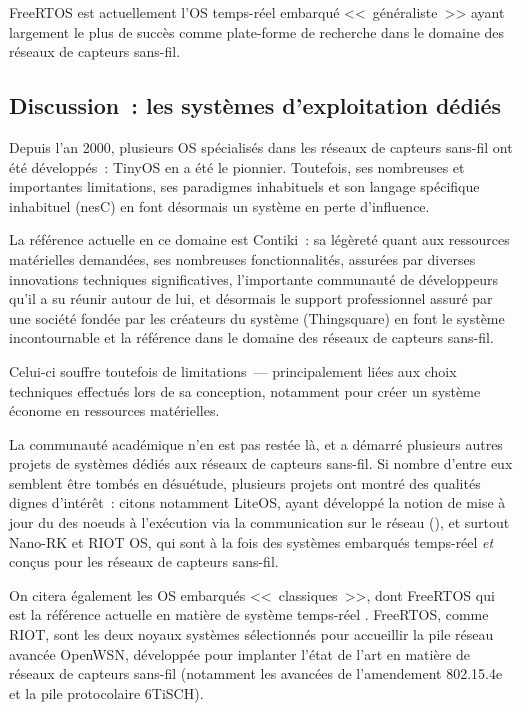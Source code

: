 \bigskip

FreeRTOS est actuellement l'OS temps-réel embarqué <<~généraliste~>> ayant
largement le plus de succès comme plate-forme de recherche dans le domaine
des réseaux de capteurs sans-fil.


\subsection{Discussion~: les systèmes d'exploitation dédiés}
\label{SubsecDiscussOS}

Depuis l'an 2000, plusieurs OS  spécialisés dans les
réseaux de capteurs sans-fil ont été développés~: TinyOS en a été le
pionnier. Toutefois, ses nombreuses et importantes limitations,
ses paradigmes inhabituels et son langage spécifique inhabituel (nesC)
en font désormais un système en perte d'influence.

\bigskip

La référence actuelle en ce domaine est Contiki~: sa légèreté quant aux
ressources matérielles demandées, ses nombreuses fonctionnalités, assurées
par diverses innovations techniques significatives, l'importante
communauté de développeurs qu'il a su réunir autour de lui, et désormais
le support professionnel assuré par une société fondée par les créateurs
du système (Thingsquare) en font le système incontournable et la référence
dans le domaine des réseaux de capteurs sans-fil.

Celui-ci souffre toutefois de limitations~--- principalement liées aux
choix techniques effectués lors de sa conception, notamment pour créer
un système économe en ressources matérielles.

\medskip

La communauté académique n'en est pas restée là, et a démarré plusieurs
autres projets de systèmes dédiés aux réseaux de capteurs sans-fil. Si
nombre d'entre eux semblent être tombés en désuétude, plusieurs projets
ont montré des qualités dignes d'intérêt~: citons notamment LiteOS,
ayant développé la notion de mise à jour du  des noeuds
à l'exécution via la communication sur le réseau (),
et surtout Nano-RK et RIOT OS, qui sont à la fois des systèmes embarqués
temps-réel \emph{et} conçus pour les réseaux de capteurs sans-fil.

On citera également les OS embarqués <<~classiques~>>, dont FreeRTOS
qui est la référence actuelle en matière de système temps-réel . FreeRTOS, comme RIOT, sont les deux noyaux systèmes sélectionnés
pour accueillir la pile réseau avancée OpenWSN, développée pour
implanter l'état de l'art en matière de réseaux de capteurs sans-fil
(notamment les avancées de l'amendement 802.15.4e et la pile protocolaire
6TiSCH).

